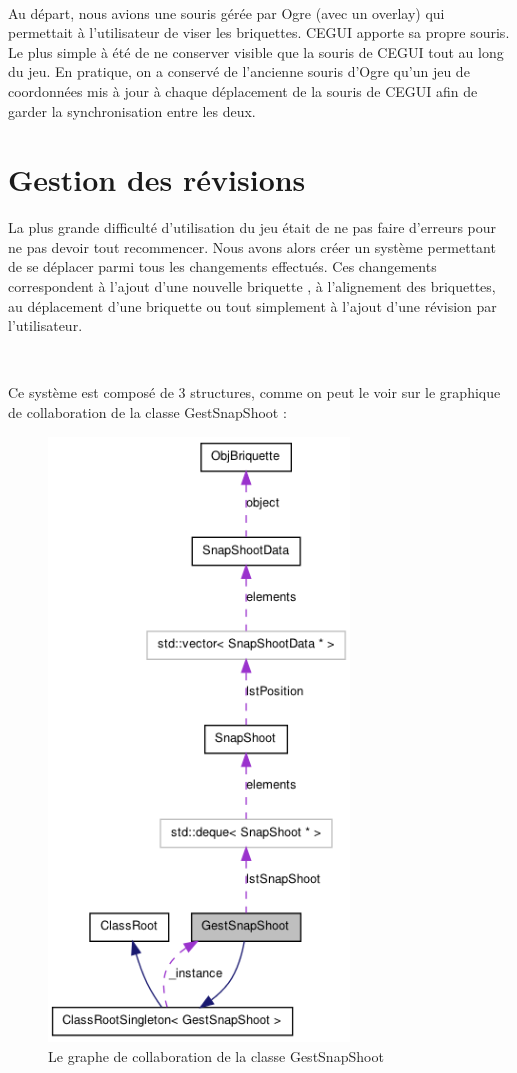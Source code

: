 \documentclass[frenchb,twoside]{EPURapport}
\begin{document}
		\

        Au départ, nous avions une souris gérée par Ogre (avec un overlay) qui
        permettait à l'utilisateur de viser les briquettes. CEGUI apporte sa
        propre souris. Le plus simple à été de ne conserver visible que la
        souris de CEGUI tout au long du jeu. En pratique, on a conservé de
        l'ancienne souris d'Ogre qu'un jeu de coordonnées mis à jour à chaque
        déplacement de la souris de CEGUI afin de garder la synchronisation
        entre les deux.
        

    \section{Gestion des révisions}
    
		La plus grande difficulté d'utilisation du jeu était de ne pas faire
		d'erreurs pour ne pas devoir tout recommencer. Nous avons alors créer
		un système permettant de se déplacer parmi tous les changements effectués.
		Ces changements correspondent à l'ajout d'une nouvelle briquette
		, à l'alignement des briquettes, au déplacement d'une briquette
		ou tout simplement à l'ajout d'une révision par l'utilisateur.
		
		\
		
		Ce système est composé de 3 structures, comme on peut le voir
		 sur le graphique de collaboration de la classe GestSnapShoot :
		\begin{figure}[h]
			\centering
			\includegraphics[width=8cm]{images/graph_collaboration_gestsnapshoot.png}
			\caption{\label{fig:graph_collaboration_gestsnapshoot}Le graphe de collaboration de la classe GestSnapShoot}
		\end{figure}
		
\end{document}

